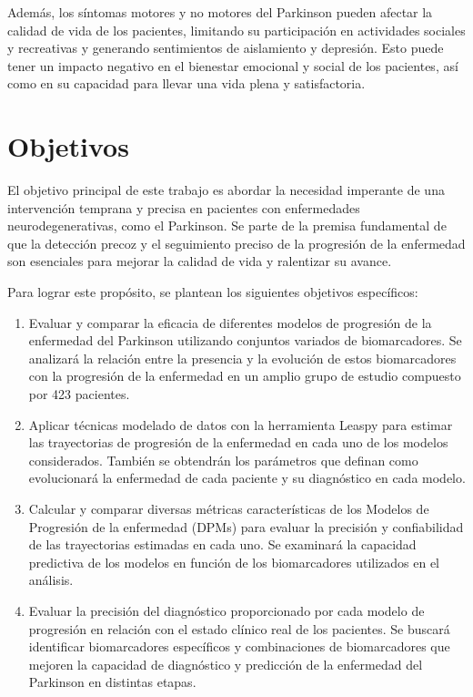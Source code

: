 Además, los síntomas motores y no motores del Parkinson pueden afectar la calidad de vida de los pacientes, limitando su participación en actividades sociales y recreativas y generando sentimientos de aislamiento y depresión. Esto puede tener un impacto negativo en el bienestar emocional y social de los pacientes, así como en su capacidad para llevar una vida plena y satisfactoria.\\


\section{Objetivos}

El objetivo principal de este trabajo es abordar la necesidad imperante de una intervención temprana y precisa en pacientes con enfermedades neurodegenerativas, como el Parkinson. Se parte de la premisa fundamental de que la detección precoz y el seguimiento preciso de la progresión de la enfermedad son esenciales para mejorar la calidad de vida y ralentizar su avance.

Para lograr este propósito, se plantean los siguientes objetivos específicos:
\begin{enumerate}
	\item Evaluar y comparar la eficacia de diferentes modelos de progresión de la enfermedad del Parkinson utilizando conjuntos variados de biomarcadores. Se analizará la relación entre la presencia y la evolución de estos biomarcadores con la progresión de la enfermedad en un amplio grupo de estudio compuesto por 423 pacientes.
	\item Aplicar técnicas modelado de datos con la herramienta Leaspy para estimar las trayectorias de progresión de la enfermedad en cada uno de los modelos considerados. También se obtendrán los parámetros que definan como evolucionará la enfermedad de cada paciente y su diagnóstico en cada modelo.
	\item Calcular y comparar diversas métricas  características de los Modelos de Progresión de la enfermedad (DPMs) para evaluar la precisión y confiabilidad de las trayectorias estimadas en cada uno. Se examinará la capacidad predictiva de los modelos en función de los biomarcadores utilizados en el análisis.
	\item Evaluar la precisión del diagnóstico proporcionado por cada modelo de progresión en relación con el estado clínico real de los pacientes. Se buscará identificar biomarcadores específicos y combinaciones de biomarcadores que mejoren la capacidad de diagnóstico y predicción de la enfermedad del Parkinson en distintas etapas.
\end{enumerate}

